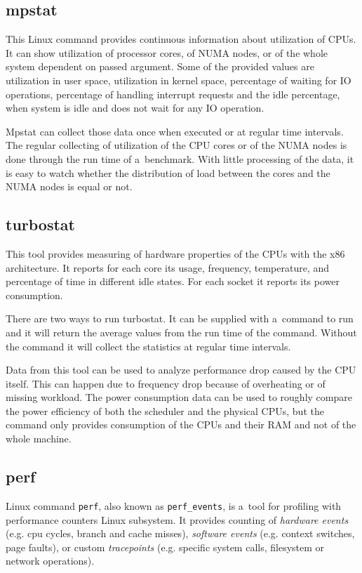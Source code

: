 \subsection{mpstat}
This Linux command provides continuous information about utilization of CPUs. It
can show utilization of processor cores, of NUMA nodes, or of the whole system
dependent on passed argument. Some of the provided values are utilization in
user space, utilization in kernel space, percentage of waiting for IO
operations, percentage of handling interrupt requests and the idle percentage,
when system is idle and does not wait for any IO operation.

Mpstat can collect those data once when executed or at regular time intervals.
The regular collecting of utilization of the CPU cores or of the NUMA nodes is
done through the run time of a~benchmark. With little processing of the data, it
is easy to watch whether the distribution of load between the cores and the NUMA
nodes is equal or not.

\subsection{turbostat}
This tool provides measuring of hardware properties of the CPUs with the x86
architecture. It reports for each core its usage, frequency, temperature, and
percentage of time in different idle states. For each socket it reports its
power consumption.

There are two ways to run turbostat. It can be supplied with a~command to run
and it will return the average values from the run time of the command. Without
the command it will collect the statistics at regular time intervals.

Data from this tool can be used to analyze performance drop caused by the CPU
itself. This can happen due to frequency drop because of overheating or of
missing workload. The power consumption data can be used to roughly compare the
power efficiency of both the scheduler and the physical CPUs, but the command
only provides consumption of the CPUs and their RAM and not of the whole
machine.

\subsection{perf}
Linux command \texttt{perf}, also known as \texttt{perf\_events}, is a~tool for
profiling with performance counters Linux subsystem. It provides counting of
\emph{hardware events} (e.g. cpu cycles, branch and cache misses),
\emph{software events} (e.g. context switches, page faults), or custom
\emph{tracepoints} (e.g. specific system calls, filesystem or network
operations).

